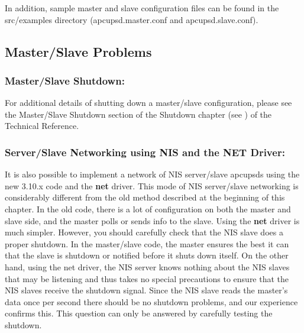 {{{{{{{{{In addition, sample master and slave configuration files can be found in the
\lt{}src\gt{}/examples directory (apcupsd.master.conf and apcupsd.slave.conf).


\label{Master_002fSlave-Problems}

\subsection*{Master/Slave Problems}

\label{index-Master_002fSlave-155}
\label{index-Problems_002c-Master_002fslave-156}

\label{Master_002fSlave-Shutdown}

\subsubsection*{Master/Slave Shutdown:}

For additional details of shutting down a master/slave configuration, please
see the Master/Slave Shutdown section of the Shutdown chapter (see 
) of the Technical
Reference. 

\label{Server_002fSlave-Networking-using-NIS-and-the-NET-Driver}

\subsubsection*{Server/Slave Networking using NIS and the NET Driver:}

\label{index-NIS-networking-157}
\label{index-Net-driver-158}
It is also possible to implement a network of NIS server/slave apcupsds using
the new 3.10.x code and the {\bf net} driver. This mode of NIS server/slave
networking is considerably different from the old method described at the
beginning of this chapter. In the old code, there is a lot of configuration on
both the master and slave side, and the master polls or sends info to the
slave. Using the {\bf net} driver is much simpler. However, you should
carefully check that the NIS slave does a proper shutdown. In the master/slave
code, the master ensures the best it can that the slave is shutdown or
notified before it shuts down itself. On the other hand, using the net driver,
the NIS server knows nothing about the NIS slaves that may be listening and
thus takes no special precautions to ensure that the NIS slaves receive the
shutdown signal. Since the NIS slave reads the master's data once per second
there should be no shutdown problems, and our experience confirms this.  This
question can only be answered by carefully testing the shutdown.  

}}}}}}}}}
